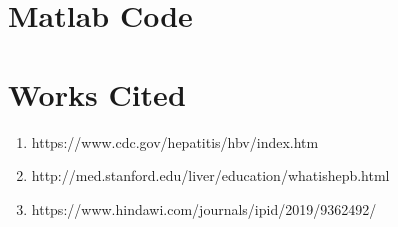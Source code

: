 \documentclass{article}
\begin{document}
\newpage

\section{Matlab Code}


\section{Works Cited}
\begin{enumerate}
    \item https://www.cdc.gov/hepatitis/hbv/index.htm
    \item http://med.stanford.edu/liver/education/whatishepb.html
    \item https://www.hindawi.com/journals/ipid/2019/9362492/
\end{enumerate}
\end{document}
